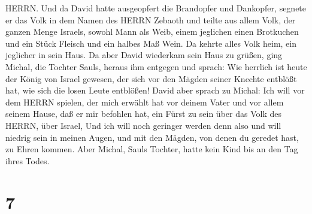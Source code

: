HERRN.  Und da David hatte ausgeopfert die Brandopfer und
Dankopfer, segnete er das Volk in dem Namen des HERRN Zebaoth
 und teilte aus allem Volk, der ganzen Menge Israels,
sowohl Mann als Weib, einem jeglichen einen Brotkuchen und ein Stück
Fleisch und ein halbes Maß Wein. Da kehrte alles Volk heim, ein
jeglicher in sein Haus.  Da aber David wiederkam sein Haus
zu grüßen, ging Michal, die Tochter Sauls, heraus ihm entgegen und
sprach: Wie herrlich ist heute der König von Israel gewesen, der sich
vor den Mägden seiner Knechte entblößt hat, wie sich die losen Leute
entblößen!  David aber sprach zu Michal: Ich will vor dem
HERRN spielen, der mich erwählt hat vor deinem Vater und vor allem
seinem Hause, daß er mir befohlen hat, ein Fürst zu sein über das Volk
des HERRN, über Israel,  Und ich will noch geringer werden
denn also und will niedrig sein in meinen Augen, und mit den Mägden, von
denen du geredet hast, zu Ehren kommen.  Aber Michal, Sauls
Tochter, hatte kein Kind bis an den Tag ihres Todes.

\hypertarget{section-6}{%
\section{7}\label{section-6}}

